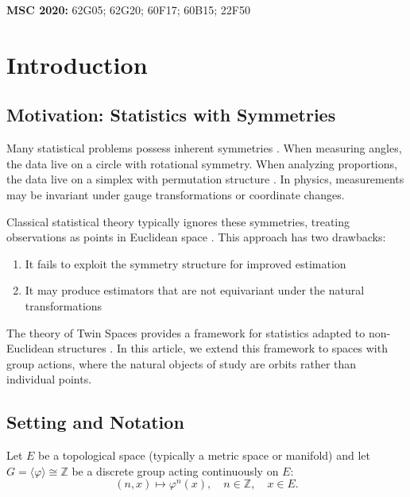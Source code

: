 \documentclass[11pt]{article}
\newcommand{\Z}{\mathbb{Z}}
\begin{document}
\noindent\textbf{MSC 2020:} 62G05; 62G20; 60F17; 60B15; 22F50

\tableofcontents

\section{Introduction}
\label{sec:intro}

\subsection{Motivation: Statistics with Symmetries}

Many statistical problems possess inherent symmetries \citep{Eaton1989,Wijsman1990}. When measuring angles, the data live on a circle with rotational symmetry. When analyzing proportions, the data live on a simplex with permutation structure \citep{Aitchison1986}. In physics, measurements may be invariant under gauge transformations or coordinate changes.

Classical statistical theory typically ignores these symmetries, treating observations as points in Euclidean space \citep{vanderVaart1998}. This approach has two drawbacks:
\begin{enumerate}[label=(\roman*)]
\item It fails to exploit the symmetry structure for improved estimation
\item It may produce estimators that are not equivariant under the natural transformations
\end{enumerate}

The theory of Twin Spaces provides a framework for statistics adapted to non-Euclidean structures \citep{Patrangenaru2016,Pennec2006}. In this article, we extend this framework to spaces with group actions, where the natural objects of study are orbits rather than individual points.

\subsection{Setting and Notation}

Let $E$ be a topological space (typically a metric space or manifold) and let $G = \langle\varphi\rangle \cong \Z$ be a discrete group acting continuously on $E$:
\begin{equation}\label{eq:action}
(n, x) \mapsto \varphi^n(x), \quad n \in \Z, \quad x \in E.
\end{equation}
\end{document}
